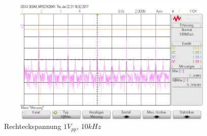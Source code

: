 \begin{figure}[H]
 \begin{center}
  \includegraphics[height=6cm,width=12cm]{OsziBilder/bsp2_Hanning_dB.png}
 \end{center}
 \caption{Rechteckspannung $1V_{pp}$, $10kHz$}\label{bsp2_dB}
\end{figure}
\noindent

